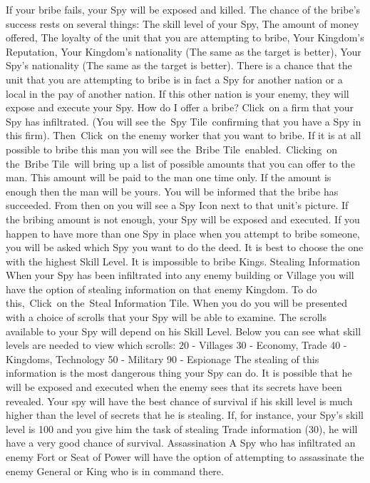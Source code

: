 If your bribe fails, your Spy will be exposed and killed.
The chance of the bribe’s success rests on several things:
The skill level of your Spy,
The amount of money offered,
The loyalty of the unit that you are attempting to bribe,
Your Kingdom’s Reputation,
Your Kingdom’s nationality (The same as the target is better),
Your Spy’s nationality (The same as the target is better).
There is a chance that the unit that you are attempting to bribe is in fact a Spy for another nation or a local in the pay of another nation. If this other nation is your enemy, they will expose and execute your Spy.
How do I offer a bribe?
Click on a firm that your Spy has infiltrated.
(You will see the Spy Tile confirming that you have a Spy in this firm).
Then Click on the enemy worker that you want to bribe.
If it is at all possible to bribe this man you will see the Bribe Tile enabled. Clicking on the Bribe Tile will bring up a list of possible amounts that you can offer to the man. This amount will be paid to the man one time only. If the amount is enough then the man will be yours. You will be informed that the bribe has succeeded. From then on you will see a Spy Icon next to that unit’s picture.
If the bribing amount is not enough, your Spy will be exposed and executed.
If you happen to have more than one Spy in place when you attempt to bribe someone, you will be asked which Spy you want to do the deed. It is best to choose the one with the highest Skill Level.
It is impossible to bribe Kings.
Stealing Information
When your Spy has been infiltrated into any enemy building or Village you will have the option of stealing information on that enemy Kingdom. To do this, Click on the Steal Information Tile. When you do you will be presented with a choice of scrolls that your Spy will be able to examine.
The scrolls available to your Spy will depend on his Skill Level. Below you can see what skill levels are needed to view which scrolls:
20 - Villages
30 - Economy, Trade
40 - Kingdoms, Technology
50 - Military
90 - Espionage
The stealing of this information is the most dangerous thing your Spy can do. It is possible that he will be exposed and executed when the enemy sees that its secrets have been revealed.
Your spy will have the best chance of survival if his skill level is much higher than the level of secrets that he is stealing. If, for instance, your Spy’s skill level is 100 and you give him the task of stealing Trade information (30), he will have a very good chance of survival.
Assassination
A Spy who has infiltrated an enemy Fort or Seat of Power will have the option of attempting to assassinate the enemy General or King who is in command there.
